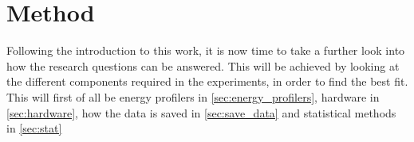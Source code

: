 \chapter{Method}\label{ch:method}

Following the introduction to this work, it is now time to take a further look into how the research questions can be answered. This will be achieved by looking at the different components required in the experiments, in order to find the best fit. This will first of all be energy profilers in \cref*{sec:energy_profilers}, hardware in \cref*{sec:hardware}, how the data is saved in \cref*{sec:save_data}  and statistical methods in \cref*{sec:stat}














